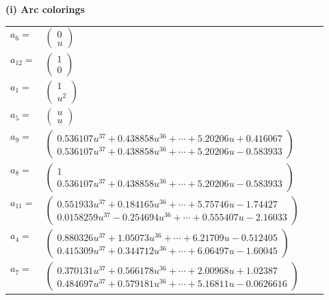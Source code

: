 \documentclass[1p]{elsarticle_modified}
\theoremstyle{definition}
\begin{document}
\flushleft \textbf{(i) Arc colorings}\\
\begin{tabular}{m{7pt} m{180pt} m{7pt} m{180pt} }
\flushright $a_{6}=$&$\begin{pmatrix}0\\u\end{pmatrix}$ \\
\flushright $a_{12}=$&$\begin{pmatrix}1\\0\end{pmatrix}$ \\
\flushright $a_{1}=$&$\begin{pmatrix}1\\u^2\end{pmatrix}$ \\
\flushright $a_{5}=$&$\begin{pmatrix}u\\u\end{pmatrix}$ \\
\flushright $a_{9}=$&$\begin{pmatrix}0.536107 u^{37}+0.438858 u^{36}+\cdots+5.20206 u+0.416067\\0.536107 u^{37}+0.438858 u^{36}+\cdots+5.20206 u-0.583933\end{pmatrix}$ \\
\flushright $a_{8}=$&$\begin{pmatrix}1\\0.536107 u^{37}+0.438858 u^{36}+\cdots+5.20206 u-0.583933\end{pmatrix}$ \\
\flushright $a_{11}=$&$\begin{pmatrix}0.551933 u^{37}+0.184165 u^{36}+\cdots+5.75746 u-1.74427\\0.0158259 u^{37}-0.254694 u^{36}+\cdots+0.555407 u-2.16033\end{pmatrix}$ \\
\flushright $a_{4}=$&$\begin{pmatrix}0.880326 u^{37}+1.05073 u^{36}+\cdots+6.21709 u-0.512405\\0.415309 u^{37}+0.344712 u^{36}+\cdots+6.06497 u-1.60045\end{pmatrix}$ \\
\flushright $a_{7}=$&$\begin{pmatrix}0.370131 u^{37}+0.566178 u^{36}+\cdots+2.00968 u+1.02387\\0.484697 u^{37}+0.579181 u^{36}+\cdots+5.16811 u-0.0626616\end{pmatrix}$ \\

\end{tabular}
\end{document}
